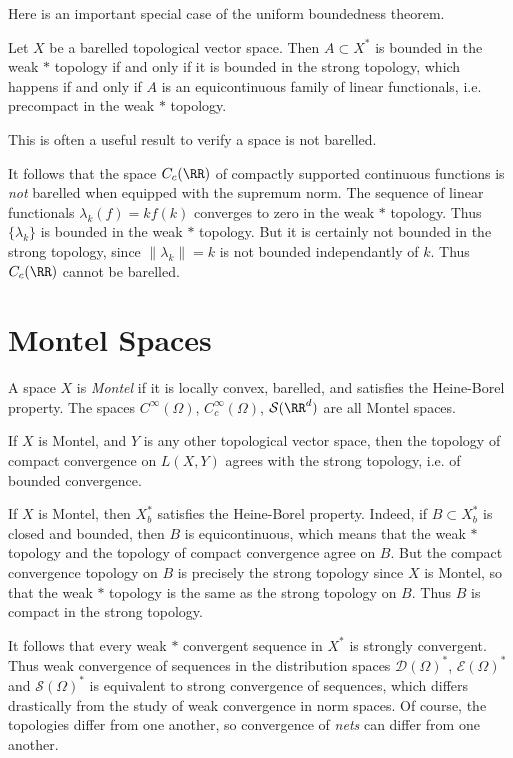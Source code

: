 Here is an important special case of the uniform boundedness theorem.

\begin{theorem}
    Let $X$ be a barelled topological vector space. Then $A \subset X^*$ is bounded in the weak $*$ topology if and only if it is bounded in the strong topology, which happens if and only if $A$ is an equicontinuous family of linear functionals, i.e. precompact in the weak $*$ topology.
\end{theorem}

This is often a useful result to verify a space is not barelled.

\begin{example}
    It follows that the space $C_c(\RR)$ of compactly supported continuous functions is \emph{not} barelled when equipped with the supremum norm. The sequence of linear functionals $\lambda_k(f) = k f(k)$ converges to zero in the weak $*$ topology. Thus $\{ \lambda_k \}$ is bounded in the weak $*$ topology. But it is certainly not bounded in the strong topology, since $\| \lambda_k \| = k$ is not bounded independantly of $k$. Thus $C_c(\RR)$ cannot be barelled.
\end{example}

\section{Montel Spaces}

A space $X$ is \emph{Montel} if it is locally convex, barelled, and satisfies the Heine-Borel property. The spaces $C^\infty(\Omega)$, $C_c^\infty(\Omega)$, $\mathcal{S}(\RR^d)$ are all Montel spaces.

\begin{theorem}
    If $X$ is Montel, and $Y$ is any other topological vector space, then the topology of compact convergence on $L(X,Y)$ agrees with the strong topology, i.e. of bounded convergence.
\end{theorem}

If $X$ is Montel, then $X^*_b$ satisfies the Heine-Borel property. Indeed, if $B \subset X^*_b$ is closed and bounded, then $B$ is equicontinuous, which means that the weak $*$ topology and the topology of compact convergence agree on $B$. But the compact convergence topology on $B$ is precisely the strong topology since $X$ is Montel, so that the weak $*$ topology is the same as the strong topology on $B$. Thus $B$ is compact in the strong topology.

It follows that every weak $*$ convergent sequence in $X^*$ is strongly convergent. Thus weak convergence of sequences in the distribution spaces $\mathcal{D}(\Omega)^*$, $\mathcal{E}(\Omega)^*$ and $\mathcal{S}(\Omega)^*$ is equivalent to strong convergence of sequences, which differs drastically from the study of weak convergence in norm spaces. Of course, the topologies differ from one another, so convergence of \emph{nets} can differ from one another.

